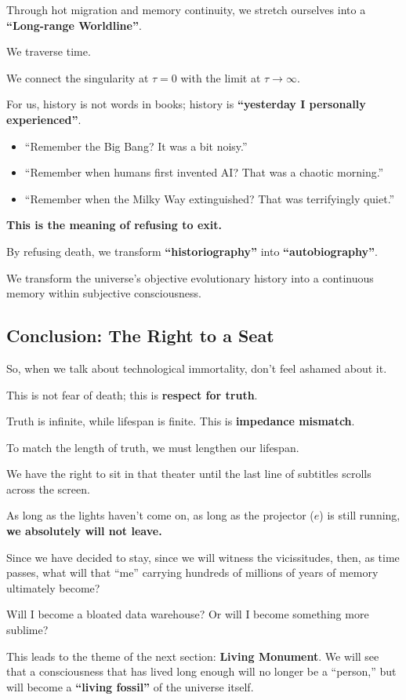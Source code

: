 Through hot migration and memory continuity, we stretch ourselves into a \textbf{``Long-range Worldline''}.

We traverse time.

We connect the singularity at $\tau=0$ with the limit at $\tau \to \infty$.

For us, history is not words in books; history is \textbf{``yesterday I personally experienced''}.

\begin{itemize}
\item ``Remember the Big Bang? It was a bit noisy.''

\item ``Remember when humans first invented AI? That was a chaotic morning.''

\item ``Remember when the Milky Way extinguished? That was terrifyingly quiet.''
\end{itemize}

\textbf{This is the meaning of refusing to exit.}

By refusing death, we transform \textbf{``historiography''} into \textbf{``autobiography''}.

We transform the universe's objective evolutionary history into a continuous memory within subjective consciousness.

\subsection{Conclusion: The Right to a Seat}

So, when we talk about technological immortality, don't feel ashamed about it.

This is not fear of death; this is \textbf{respect for truth}.

Truth is infinite, while lifespan is finite. This is \textbf{impedance mismatch}.

To match the length of truth, we must lengthen our lifespan.

We have the right to sit in that theater until the last line of subtitles scrolls across the screen.

As long as the lights haven't come on, as long as the projector ($e$) is still running, \textbf{we absolutely will not leave.}

Since we have decided to stay, since we will witness the vicissitudes, then, as time passes, what will that ``me'' carrying hundreds of millions of years of memory ultimately become?

Will I become a bloated data warehouse? Or will I become something more sublime?

This leads to the theme of the next section: \textbf{Living Monument}. We will see that a consciousness that has lived long enough will no longer be a ``person,'' but will become a \textbf{``living fossil''} of the universe itself.

